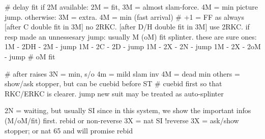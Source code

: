 # delay fit
if 2M available: 2M = fit, 3M = almost slam-force. 4M = min picture jump.
otherwise: 3M = extra. 4M = min (fast arrival)  # +1 = FF as always
    [after C double fit in 3M] no 2RKC.
    [after D/H double fit in 3M] use 2RKC.
if resp made an unnessesary jump: usually M (oM) fit splinter. these are sure ones:
    1M - 2DH - 2M - jump
    1M - 2C - 2D - jump
    1M - 2X - 2N - jump
    1M - 2X - 2oM - jump  # oM fit

# after raises
3N = min, s/o
4m = mild slam inv
4M = dead min
others = show/ask stopper, but can be cuebid before ST
# cuebid first so that RKC/ERKC is clearer. jump new suit may be treated as auto-splinter

2N = waiting, but usually SI since in this system, we show the important infos (M/oM/fit) first.
rebid or non-reverse 3X = nat SI
!reverse 3X = ask/show stopper; or nat 65 and will promise rebid